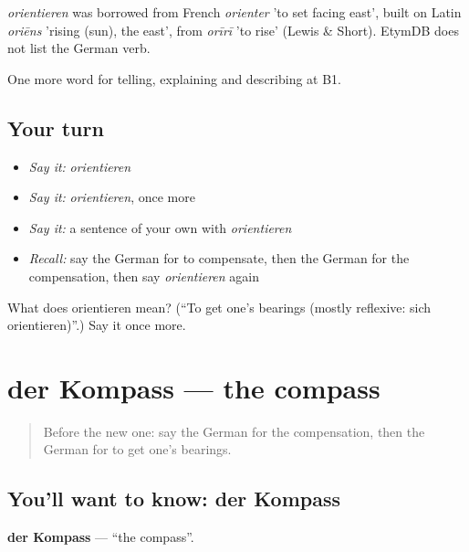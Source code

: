 \begin{cousinweb}
\emph{orientieren} was borrowed from French \emph{orienter} 'to set facing east', built on Latin \emph{oriēns} 'rising (sun), the east', from \emph{orīrī} 'to rise' (Lewis \& Short). EtymDB does not list the German verb.
\end{cousinweb}

\begin{grammarlens}[title={What you've built}]
One more word for telling, explaining and describing at B1.
\end{grammarlens}

\subsection*{Your turn}
\begin{itemize}
\raggedright
  \item \emph{Say it:} \emph{orientieren}
  \item \emph{Say it:} \emph{orientieren}, once more
  \item \emph{Say it:} a sentence of your own with \emph{orientieren}
  \item \emph{Recall:} say the German for to compensate, then the German for the compensation, then say \emph{orientieren} again
\end{itemize}

\begin{tcolorbox}[breakable,colback=teal!4,colframe=teal!35!black,title={Before you move on}]
What does orientieren mean? (\textquotedblleft{}To get one's bearings (mostly reflexive: sich orientieren)\textquotedblright{}.) Say it once more.
\end{tcolorbox}
\section[der Kompass]{der Kompass — the compass}

\label{lesson:GE-C433-kompass}



\begin{quote}
Before the new one: say the German for the compensation, then the German for to get one's bearings.
\end{quote}

\subsection*{You'll want to know: der Kompass}
\textbf{der Kompass} — \textquotedblleft{}the compass\textquotedblright{}.

